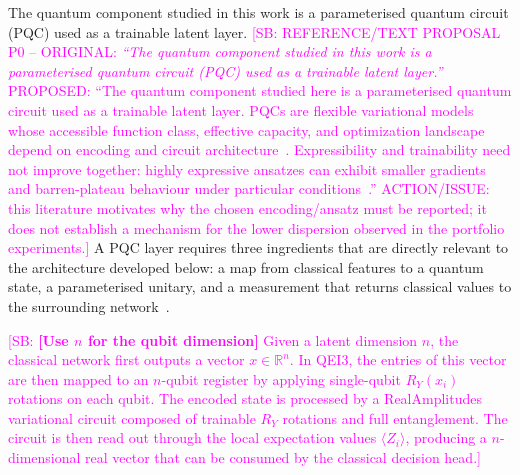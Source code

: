 \documentclass[aps,floatfix,superscriptaddress,twocolumn,tightenlines,amsmath,amssymb,nofootinbib,10pt,longbibliography,prl]{revtex4-2}
\newcommand{\sam}[1]{\textcolor{magenta}{[SB: {#1}]}}
\begin{document}
The quantum component studied in this work is a parameterised quantum circuit (PQC) used as a trainable latent layer.
\sam{REFERENCE/TEXT PROPOSAL P0 -- ORIGINAL: \textit{``The quantum component studied in this work is a parameterised quantum circuit (PQC) used as a trainable latent layer.''} PROPOSED: ``The quantum component studied here is a parameterised quantum circuit used as a trainable latent layer. PQCs are flexible variational models whose accessible function class, effective capacity, and optimization landscape depend on encoding and circuit architecture~\cite{Benedetti2019Parameterizedquant,Schuld2021Effectofdataencodi,Haug2021CapacityQuantumGeometry}. Expressibility and trainability need not improve together: highly expressive ansatzes can exhibit smaller gradients and barren-plateau behaviour under particular conditions~\cite{Sim2019ExpressibilityandE,Holmes2022ConnectingAnsatzEx,Larocca2025BarrenPlateaus}.'' ACTION/ISSUE: this literature motivates why the chosen encoding/ansatz must be reported; it does not establish a mechanism for the lower dispersion observed in the portfolio experiments.} A PQC layer requires three ingredients that are directly relevant to the architecture developed below: a map from classical features to a quantum state, a parameterised unitary, and a measurement that returns classical values to the surrounding network~\cite{Benedetti2019Parameterizedquant,Cerezo2021Variationalquantum}.

\sam{\textbf{[Use $n$ for the qubit dimension]} Given a latent dimension $n$, the classical network first outputs a vector $x\in\mathbb{R}^{n}$. In QEI3, the entries of this vector are then mapped to an $n$-qubit register by applying single-qubit $R_Y(x_i)$ rotations on each qubit. The encoded state is processed by a RealAmplitudes variational circuit composed of trainable $R_Y$ rotations and full entanglement. The circuit is then read out through the local expectation values $\langle Z_i\rangle$, producing a $n$-dimensional real vector that can be consumed by the classical decision head.}
\end{document}
